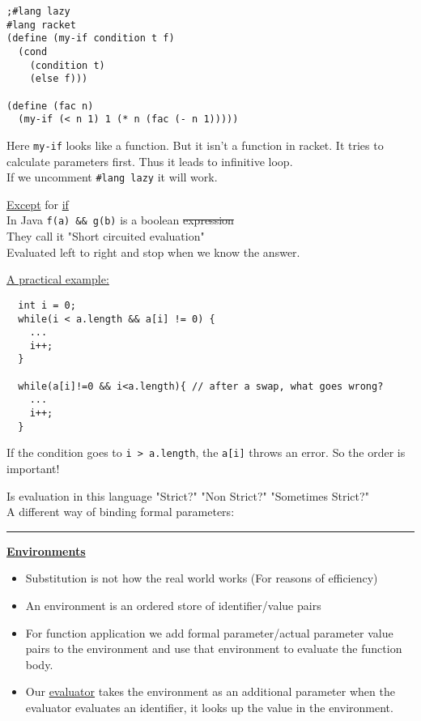 \documentclass{article}
\begin{document}
\begin{verbatim}
;#lang lazy
#lang racket
(define (my-if condition t f)
  (cond
    (condition t)
    (else f)))
    
(define (fac n)
  (my-if (< n 1) 1 (* n (fac (- n 1)))))
\end{verbatim}
Here \verb|my-if| looks like a function. But it isn't a function in racket. It tries to calculate parameters first. Thus it leads to infinitive loop.\\
If we uncomment \verb|#lang lazy| it will work. 

\begin{flushleft}
\underline{Except} for \underline{if}\\
In Java \verb|f(a) && g(b)| is a boolean \st{expression}\\
They call it "Short circuited evaluation"\\
Evaluated left to right and stop when we know the answer.
\end{flushleft}

\begin{flushleft}
 
\underline{A practical example:}
\begin{verbatim}
  int i = 0;
  while(i < a.length && a[i] != 0) {
    ...
    i++;
  }
  
  while(a[i]!=0 && i<a.length){	// after a swap, what goes wrong?
    ...
    i++;
  }
\end{verbatim}
If the condition goes to \verb|i > a.length|, the \verb|a[i]| throws an error. So the order is important!
\end{flushleft}

\begin{flushleft}
Is evaluation in this language "Strict?" "Non Strict?" "Sometimes Strict?"\\
A different way of binding formal parameters: \noindent\rule{3cm}{0.4pt}
\end{flushleft}
\begin{center}
\textbf{\underline{Environments}}
\end{center}

\begin{flushleft}
\begin{itemize}
 \item Substitution is not how the real world works (For reasons of efficiency)
 \item An environment is an ordered store of identifier/value pairs
 \item For function application we add formal parameter/actual parameter value pairs to the environment and use that environment to evaluate the function body.
 \item Our \underline{evaluator} takes the environment as an additional parameter when the evaluator evaluates an identifier, it looks up the value in the environment.
\end{itemize}

\end{flushleft}
\end{document}
